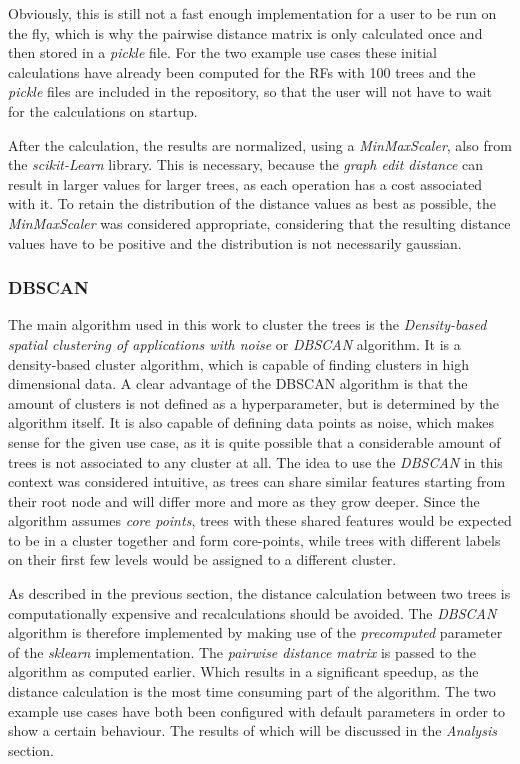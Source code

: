 \documentclass[a4paper, 12pt]{article}
\begin{document}
Obviously, this is still not a fast enough implementation for a user to be run on the fly, which
is why the pairwise distance matrix is only calculated once and then stored in a \textit{pickle}
file. For the two example use cases these initial calculations have already been computed for the
RFs with 100 trees and the \textit{pickle} files are included in the repository, so that the user
will not have to wait for the calculations on startup. \par
After the calculation, the results are normalized, using a \textit{MinMaxScaler}, also from the
\textit{scikit-Learn} library. This is necessary, because the \textit{graph edit distance} can
result in larger values for larger trees, as each operation has a cost associated with it. To
retain the distribution of the distance values as best as possible, the \textit{MinMaxScaler}
was considered appropriate, considering that the resulting distance values have to be positive
and the distribution is not necessarily gaussian.

\subsubsection{DBSCAN}
The main algorithm used in this work to cluster the trees is the \textit{Density-based spatial
    clustering of applications with noise} or \textit{DBSCAN} algorithm. It is
a density-based cluster algorithm, which is capable of finding clusters in high dimensional data.
A clear advantage of the DBSCAN algorithm is that the amount of clusters is not defined as a
hyperparameter, but is determined by the algorithm itself. It is also capable of defining data
points as noise, which makes sense for the given use case, as it is quite possible that a
considerable amount of trees is not associated to any cluster at all. The idea to use the
\textit{DBSCAN} in this context was considered intuitive, as trees can share similar features
starting from their root node and will differ more and more as they grow deeper. Since the
algorithm assumes \textit{core points}, trees with these shared features would be expected to
be in a cluster together and form core-points, while trees with different labels on their first
few levels would be assigned to a different cluster. \par

As described in the previous section, the distance calculation between two trees is computationally
expensive and recalculations should be avoided. The \textit{DBSCAN} algorithm is therefore
implemented by making use of the \textit{precomputed} parameter of the \textit{sklearn}
implementation. The \textit{pairwise distance matrix} is passed to the algorithm as computed
earlier. Which results in a significant speedup, as the distance calculation is the most time
consuming part of the algorithm. The two example use cases have both been configured with default
parameters in order to show a certain behaviour. The results of which will be discussed in the
\textit{Analysis} section. \par
\end{document}
